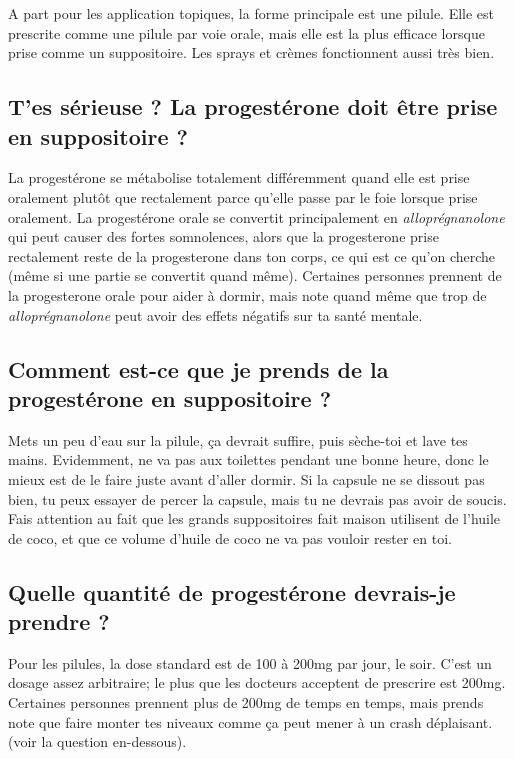 \documentclass{article}
\begin{document}
A part pour les application topiques, la forme principale est une pilule. Elle est prescrite comme une pilule par voie orale, mais elle est la plus efficace lorsque prise comme un suppositoire. Les sprays et crèmes fonctionnent aussi très bien. 

\subsection{T'es sérieuse ? La progestérone doit être prise en suppositoire ?}

La progestérone se métabolise totalement différemment quand elle est prise oralement plutôt que rectalement parce qu'elle passe par le foie lorsque prise oralement. La progestérone orale se convertit principalement en \textit{alloprégnanolone} qui peut causer des fortes somnolences, alors que la progesterone prise rectalement reste de la progesterone dans ton corps, ce qui est ce qu'on cherche (même si une partie se convertit quand même). Certaines personnes prennent de la progesterone orale pour aider à dormir, mais note quand même que trop de \textit{alloprégnanolone} peut avoir des effets négatifs sur ta santé mentale.

\subsection{Comment est-ce que je prends de la progestérone en suppositoire ?}

Mets un peu d'eau sur la pilule, ça devrait suffire, puis sèche-toi et lave tes mains. Evidemment, ne va pas aux toilettes pendant une bonne heure, donc le mieux est de le faire juste avant d'aller dormir. Si la capsule ne se dissout pas bien, tu peux essayer de percer la capsule, mais tu ne devrais pas avoir de soucis. Fais attention au fait que les grands suppositoires fait maison utilisent de l'huile de coco, et que ce volume d'huile de coco ne va pas vouloir rester en toi.  

\subsection{Quelle quantité de progestérone devrais-je prendre ?}

Pour les pilules, la dose standard est de 100 à 200mg par jour, le soir. C'est un dosage assez arbitraire; le plus que les docteurs acceptent de prescrire est 200mg. Certaines personnes prennent plus de 200mg de temps en temps, mais prends note que faire monter tes niveaux comme ça peut mener à un crash déplaisant. (voir la question en-dessous).
\end{document}
